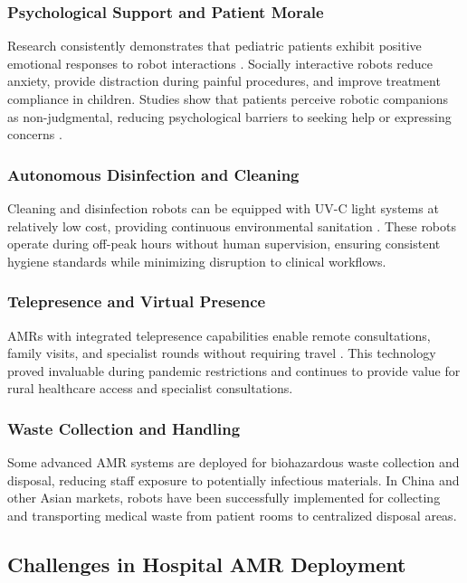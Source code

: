 \documentclass[11pt,a4paper]{article}
\begin{document}
\subsubsection{Psychological Support and Patient Morale}

Research consistently demonstrates that pediatric patients exhibit positive emotional responses to robot interactions \cite{beran2013}. Socially interactive robots reduce anxiety, provide distraction during painful procedures, and improve treatment compliance in children. Studies show that patients perceive robotic companions as non-judgmental, reducing psychological barriers to seeking help or expressing concerns \cite{ahu2024}.

\subsubsection{Autonomous Disinfection and Cleaning}

Cleaning and disinfection robots can be equipped with UV-C light systems at relatively low cost, providing continuous environmental sanitation \cite{intel2024}. These robots operate during off-peak hours without human supervision, ensuring consistent hygiene standards while minimizing disruption to clinical workflows.

\subsubsection{Telepresence and Virtual Presence}

AMRs with integrated telepresence capabilities enable remote consultations, family visits, and specialist rounds without requiring travel \cite{garingo2016}. This technology proved invaluable during pandemic restrictions and continues to provide value for rural healthcare access and specialist consultations.

\subsubsection{Waste Collection and Handling}

Some advanced AMR systems are deployed for biohazardous waste collection and disposal, reducing staff exposure to potentially infectious materials. In China and other Asian markets, robots have been successfully implemented for collecting and transporting medical waste from patient rooms to centralized disposal areas.

\subsection{Challenges in Hospital AMR Deployment}
\end{document}
